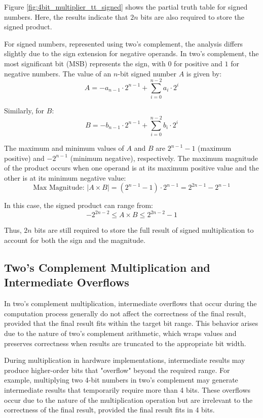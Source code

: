 Figure \ref{fig:4bit_multiplier_tt_signed} shows the partial truth table for signed numbers. Here, the results indicate that $2n$ bits are also required to store the signed product. 

For signed numbers, represented using two's complement, the analysis differs slightly due to the sign extension for negative operands. In two's complement, the most significant bit (MSB) represents the sign, with $0$ for positive and $1$ for negative numbers. The value of an $n$-bit signed number $A$ is given by:
\[
A = -a_{n-1} \cdot 2^{n-1} + \sum_{i=0}^{n-2} a_i \cdot 2^i
\]

Similarly, for $B$:
\[
B = -b_{n-1} \cdot 2^{n-1} + \sum_{i=0}^{n-2} b_i \cdot 2^i
\]

The maximum and minimum values of $A$ and $B$ are $2^{n-1} - 1$ (maximum positive) and $-2^{n-1}$ (minimum negative), respectively. The maximum magnitude of the product occurs when one operand is at its maximum positive value and the other is at its minimum negative value:
\[
\text{Max Magnitude: } |A \times B| = (2^{n-1} - 1) \cdot 2^{n-1} = 2^{2n-1} - 2^{n-1}
\]

In this case, the signed product can range from:
\[
-2^{2n-2} \leq A \times B \leq 2^{2n-2} - 1
\]

Thus, $2n$ bits are still required to store the full result of signed multiplication to account for both the sign and the magnitude.

\subsection{Two's Complement Multiplication and Intermediate Overflows}

In two's complement multiplication, intermediate overflows that occur during the computation process generally do not affect the correctness of the final result, provided that the final result fits within the target bit range. This behavior arises due to the nature of two's complement arithmetic, which wraps values and preserves correctness when results are truncated to the appropriate bit width.

During multiplication in hardware implementations, intermediate results may produce higher-order bits that "overflow" beyond the required range. For example, multiplying two 4-bit numbers in two's complement may generate intermediate results that temporarily require more than 4 bits. These overflows occur due to the nature of the multiplication operation but are irrelevant to the correctness of the final result, provided the final result fits in 4 bits.

